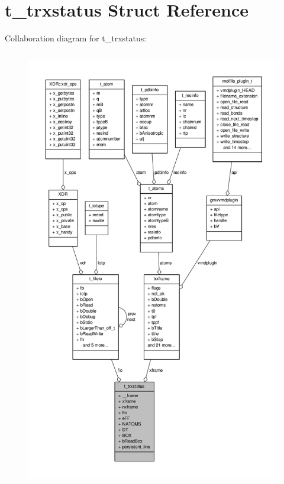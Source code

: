 \hypertarget{structt__trxstatus}{\section{t\-\_\-trxstatus \-Struct \-Reference}
\label{structt__trxstatus}
}


\-Collaboration diagram for t\-\_\-trxstatus\-:
\nopagebreak
\begin{figure}[H]
\begin{center}
\leavevmode
\includegraphics[height=550pt]{structt__trxstatus__coll__graph}
\end{center}
\end{figure}
